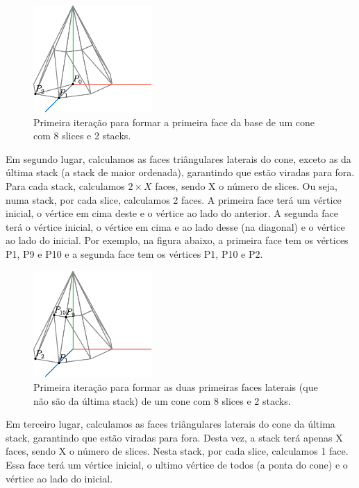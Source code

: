 \documentclass[12pt, a4paper]{article}
\begin{document}
\begin{figure}[H]
    \centering
    \includegraphics[width=0.4\textwidth]{res/figures/Cone3.pdf}
    \caption{
        Primeira iteração para formar a primeira face da base de um cone com 8 slices e 2 stacks.
    }
\end{figure}

Em segundo lugar, calculamos as faces triângulares laterais do cone, exceto as da última stack
(a stack de maior ordenada), garantindo que estão viradas para fora. Para cada stack, calculamos
$2 \times X$ faces, sendo X o número de slices. Ou seja, numa stack, por cada slice, calculamos
2 faces. A primeira face terá um vértice inicial, o vértice em cima deste e o vértice ao lado do
anterior. A segunda face terá o vértice inicial, o vértice em cima e ao lado desse (na diagonal) e o
vértice ao lado do inicial. Por exemplo, na figura abaixo, a primeira face tem os vértices P1,
P9 e P10 e a segunda face tem os vértices P1, P10 e P2.

\begin{figure}[H]
    \centering
    \includegraphics[width=0.4\textwidth]{res/figures/Cone4.pdf}
    \caption{
        Primeira iteração para formar as duas primeiras faces laterais (que
        não são da última stack) de um cone com 8 slices e 2 stacks.
    }
\end{figure}

Em terceiro lugar, calculamos as faces triângulares laterais do cone da última stack, garantindo
que estão viradas para fora. Desta vez, a stack terá apenas X faces, sendo X o número de slices.
Nesta stack, por cada slice, calculamos 1 face. Essa face terá um vértice inicial, o ultimo
vértice de todos (a ponta do cone) e o vértice ao lado do inicial.
\end{document}
